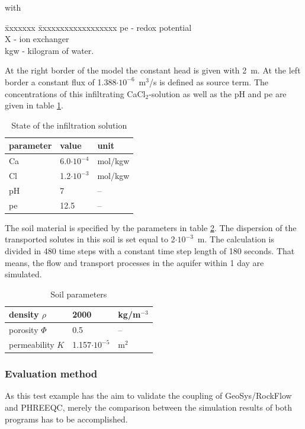 {\small
with
\begin{tabbing}
\=xxxxxxx \=xxxxxxxxxxxxxxxxxx \kill
\> pe \> - redox potential \\
\> X \> - ion exchanger \\
\> kgw \> - kilogram of water. \\
\end{tabbing}
}

At the right border of the model the constant head is given with 2~m. At the left border a constant flux of 1.388$\cdot 10^{-6}$~m$^3$/s is defined as source term. The concentrations of this infiltrating CaCl$_2$-solution as well as the pH and pe are given in table \ref{tab57}.

\begin{table}[htbp]
\centering
\begin{tabular}{|l|l|l|}
\hline
parameter & value & unit \\
\hline
Ca & 6.0$\cdot 10^{-4}$ & mol/kgw \\
\hline
Cl & 1.2$\cdot 10^{-3}$ & mol/kgw \\
\hline
pH & 7 & -- \\
\hline
pe & 12.5 & -- \\
\hline
\end{tabular}
\caption{State of the infiltration solution}
\label{tab57}
\end{table}

The soil material is specified by the parameters in table \ref{tab58}. The dispersion of the transported solutes in this soil is set equal to 2$\cdot 10^{-3}$~m. The calculation is divided in 480 time steps with a constant time step length of 180 seconds. That means, the flow and transport processes in the aquifer within 1 day are simulated.

\begin{table}[htbp]
\centering
\begin{tabular}{|l|l|l|}
\hline
density $\rho$  & 2000 & kg/m$^{-3}$  \\
\hline
porosity $\Phi$ & 0.5 & -- \\
\hline
permeability $K$ & 1.157$\cdot 10^{-5}$ & m$^2$ \\
\hline
\end{tabular}
\caption{Soil parameters}
\label{tab58}
\end{table}

\subsubsection*{Evaluation method}
As this test example has the aim to validate the coupling of GeoSys/RockFlow and PHREEQC, merely the comparison between the simulation results of both programs has to be accomplished.


